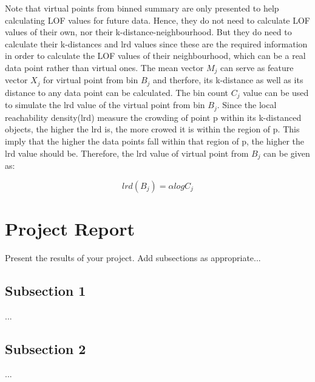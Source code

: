 \documentclass[11pt]{article}       %
\begin{document}
Note that virtual points from binned summary are only presented to help calculating LOF values for future data. Hence, they do not need to calculate LOF values of their own, nor their k-distance-neighbourhood. But they do need to calculate their k-distances and lrd values since these are the required information in order to calculate the LOF values of their neighbourhood, which can be a real data point rather than virtual ones. The mean vector $M_j$ can serve as feature vector $X_j$ for virtual point from bin $B_j$ and therfore, its k-distance as well as its distance to any data point can be calculated. The bin count $C_j$ value can be used to simulate the lrd value of the virtual point from bin $B_j$. Since the local reachability density(lrd) measure the crowding of point p within its k-distanced objects, the higher the lrd is, the more crowed it is within the region of p. This imply that the higher the data points fall within that region of p, the higher the lrd value should be. Therefore, the lrd value of virtual point from $B_j$ can be given as:

\[ lrd(B_j) = \alpha log C_j \]

\section{Project Report} \label{projrep}

Present the results of your project. Add subsections as appropriate...

\subsection{Subsection 1} \label{subsect1}

...

\subsection{Subsection 2} \label{subsect2}

...

\end{document}

